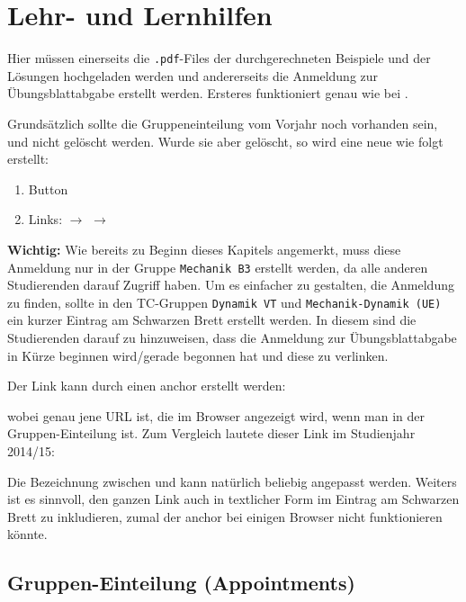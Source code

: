 \section{Lehr- und Lernhilfen}

Hier müssen einerseits die {\tt .pdf}-Files der durchgerechneten Beispiele und
der Lösungen hochgeladen werden und andererseits die Anmeldung zur 
Übungsblattabgabe erstellt werden. Ersteres funktioniert genau wie bei
.

Grundsätzlich sollte die Gruppeneinteilung vom Vorjahr noch vorhanden sein, und
nicht gelöscht werden. Wurde sie aber gelöscht, so wird eine neue wie folgt
erstellt:
\begin{enumerate}
\item Button 
\item Links:  $\to$ 
  $\to$ 
\end{enumerate}

{\bf Wichtig:}
Wie bereits zu Beginn dieses Kapitels angemerkt, muss diese Anmeldung nur in
der Gruppe {\tt Mechanik B3} erstellt werden, da alle anderen Studierenden
darauf Zugriff haben. Um es einfacher zu gestalten, die Anmeldung
zu finden, sollte in den TC-Gruppen {\tt Dynamik VT} und 
{\tt Mechanik-Dynamik (UE)} ein kurzer Eintrag am Schwarzen Brett erstellt 
werden. In diesem sind die Studierenden darauf zu hinzuweisen, dass die 
Anmeldung zur Übungsblattabgabe in Kürze beginnen wird/gerade begonnen hat und 
diese zu verlinken.

Der Link kann durch einen anchor erstellt werden:\\

wobei  genau jene URL ist, die im Browser angezeigt wird, wenn
man in der Gruppen-Einteilung ist. Zum Vergleich lautete dieser Link
im Studienjahr 2014/15:\\

Die Bezeichnung zwischen  und  kann natürlich 
beliebig angepasst werden. Weiters ist es sinnvoll, den ganzen Link auch
in textlicher Form im Eintrag am Schwarzen Brett zu inkludieren, zumal
der anchor bei einigen Browser nicht funktionieren könnte.


\subsection{Gruppen-Einteilung (Appointments)}

